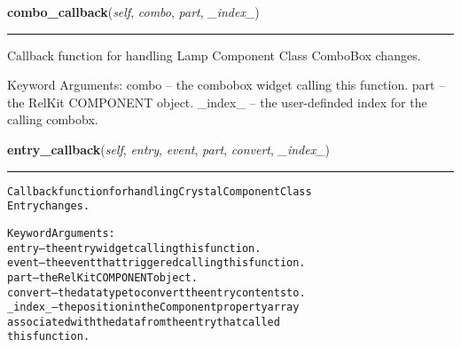     \label{reliafree:miscellaneous:filter:Filter:combo_callback}

    \vspace{0.5ex}

\hspace{.8\funcindent}\begin{boxedminipage}{\funcwidth}

    \raggedright \textbf{combo\_callback}(\textit{self}, \textit{combo}, \textit{part}, \textit{\_index\_})

    \vspace{-1.5ex}

    \rule{\textwidth}{0.5\fboxrule}
\setlength{\parskip}{2ex}
    Callback function for handling Lamp Component Class ComboBox changes.

    Keyword Arguments: combo   -- the combobox widget calling this 
    function. part    -- the RelKit COMPONENT object. \_index\_ -- the 
    user-definded index for the calling combobx.

\setlength{\parskip}{1ex}
    \end{boxedminipage}

    \label{reliafree:miscellaneous:filter:Filter:entry_callback}

    \vspace{0.5ex}

\hspace{.8\funcindent}\begin{boxedminipage}{\funcwidth}

    \raggedright \textbf{entry\_callback}(\textit{self}, \textit{entry}, \textit{event}, \textit{part}, \textit{convert}, \textit{\_index\_})

    \vspace{-1.5ex}

    \rule{\textwidth}{0.5\fboxrule}
\setlength{\parskip}{2ex}
\begin{alltt}
Callback function for handling Crystal Component Class
Entry changes.

Keyword Arguments:
entry   -- the entry widget calling this function.
event   -- the event that triggered calling this function.
part    -- the RelKit COMPONENT object.
convert -- the data type to convert the entry contents to.
\_index\_ -- the position in the Component property array
           associated with the data from the entry that called
           this function.
\end{alltt}

\setlength{\parskip}{1ex}
    \end{boxedminipage}

